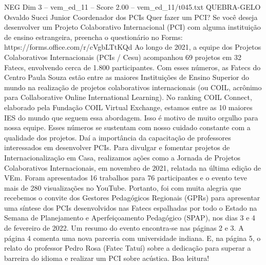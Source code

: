 \begin{textsample}{NEG Dim 3 – vem\_ed\_11 – Score 2.00 – vem\_ed\_11/t045.txt}  \label{ex:f3_neg_085}
QUEBRA-GELO Osvaldo Succi Junior Coordenador dos PCIs Quer fazer um PCI?
Se você deseja desenvolver um Projeto Colaborativo Internacional (PCI) com alguma instituição de ensino estrangeira, preencha o questionário no Forms: https://forms.office.com/r/cVgbLTtKQd Ao longo de 2021, a equipe dos Projetos Colaborativos Internacionais (PCIs / Cesu) acompanhou 69 projetos em 32 Fatecs, envolvendo cerca de 1.800 participantes.
Com esses números, as Fatecs do Centro Paula Souza estão entre as maiores Instituições de Ensino Superior do mundo na realização de projetos colaborativos internacionais (ou COIL, acrônimo para Collaborative Online International Learning).
No ranking COIL Connect, elaborado pela Fundação COIL Virtual Exchange, estamos entre as 10 maiores IES do mundo que seguem essa abordagem.
Isso é motivo de muito orgulho para nossa equipe.
Esses números se sustentam com nosso cuidado constante com a qualidade dos projetos.
Daí a importância da capacitação de professores interessados em desenvolver PCIs.
Para divulgar e fomentar projetos de Internacionalização em Casa, realizamos ações como a Jornada de Projetos Colaborativos Internacionais, em novembro de 2021, relatada na última edição de VEm.
Foram apresentados 16 trabalhos para 76 participantes e o evento teve mais de 280 visualizações no YouTube.
Portanto, foi com muita alegria que recebemos o convite dos Gestores Pedagógicos Regionais (GPRs) para apresentar uma síntese dos PCIs desenvolvidos nas Fatecs espalhadas por todo o Estado na Semana de Planejamento e Aperfeiçoamento Pedagógico (SPAP), nos dias 3 e 4 de fevereiro de 2022.
Um resumo do evento encontra-se nas páginas 2 e 3.
A página 4 comenta uma nova parceria com universidade indiana.
E, na página 5, o relato do professor Pedro Rosa (Fatec Tatuí) sobre a dedicação para superar a barreira do idioma e realizar um PCI sobre acústica.
Boa leitura!

\end{textsample}
